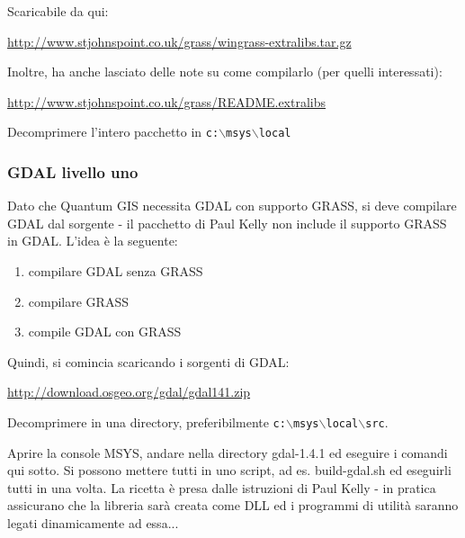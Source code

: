 Scaricabile da qui:

\url{http://www.stjohnspoint.co.uk/grass/wingrass-extralibs.tar.gz}

Inoltre, ha anche lasciato delle note su come compilarlo (per quelli interessati):

\url{http://www.stjohnspoint.co.uk/grass/README.extralibs}

Decomprimere l'intero pacchetto in \texttt{c:$\backslash$msys$\backslash$local}

\subsubsection{GDAL livello uno}
Dato che Quantum GIS necessita GDAL con supporto GRASS, si deve compilare GDAL dal sorgente - il pacchetto di Paul Kelly non include il supporto GRASS in GDAL.
L'idea è la seguente:

\begin{enumerate}
\item compilare GDAL senza GRASS
\item compilare GRASS
\item compile GDAL con GRASS
\end{enumerate}

Quindi, si comincia scaricando i sorgenti di GDAL:

\url{http://download.osgeo.org/gdal/gdal141.zip}

Decomprimere in una directory, preferibilmente \texttt{c:$\backslash$msys$\backslash$local$\backslash$src}.

Aprire la console MSYS, andare nella directory gdal-1.4.1 ed eseguire i comandi qui sotto. Si possono mettere tutti in uno script, ad es. build-gdal.sh ed eseguirli tutti in una volta. La ricetta è presa dalle istruzioni di Paul Kelly - in pratica assicurano che la libreria sarà creata come DLL ed i programmi di utilità saranno legati dinamicamente ad essa...

